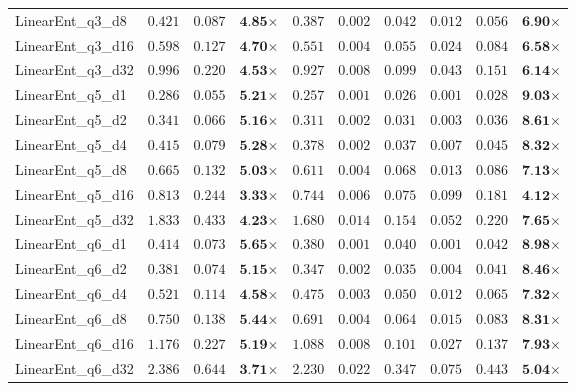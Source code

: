 \begin{table*}[t]
{\begin{tabular}{| l || r r c || r r r r r c |}
LinearEnt\_q3\_d8 & $0.421$ & $0.087$ & $\textbf{4.85}$$\times$ & $0.387$ & $0.002$ & $0.042$ & $0.012$ & $0.056$ & $\textbf{6.90}$$\times$ \\
LinearEnt\_q3\_d16 & $0.598$ & $0.127$ & $\textbf{4.70}$$\times$ & $0.551$ & $0.004$ & $0.055$ & $0.024$ & $0.084$ & $\textbf{6.58}$$\times$ \\
LinearEnt\_q3\_d32 & $0.996$ & $0.220$ & $\textbf{4.53}$$\times$ & $0.927$ & $0.008$ & $0.099$ & $0.043$ & $0.151$ & $\textbf{6.14}$$\times$ \\
LinearEnt\_q5\_d1 & $0.286$ & $0.055$ & $\textbf{5.21}$$\times$ & $0.257$ & $0.001$ & $0.026$ & $0.001$ & $0.028$ & $\textbf{9.03}$$\times$ \\
LinearEnt\_q5\_d2 & $0.341$ & $0.066$ & $\textbf{5.16}$$\times$ & $0.311$ & $0.002$ & $0.031$ & $0.003$ & $0.036$ & $\textbf{8.61}$$\times$ \\
LinearEnt\_q5\_d4 & $0.415$ & $0.079$ & $\textbf{5.28}$$\times$ & $0.378$ & $0.002$ & $0.037$ & $0.007$ & $0.045$ & $\textbf{8.32}$$\times$ \\
LinearEnt\_q5\_d8 & $0.665$ & $0.132$ & $\textbf{5.03}$$\times$ & $0.611$ & $0.004$ & $0.068$ & $0.013$ & $0.086$ & $\textbf{7.13}$$\times$ \\
LinearEnt\_q5\_d16 & $0.813$ & $0.244$ & $\textbf{3.33}$$\times$ & $0.744$ & $0.006$ & $0.075$ & $0.099$ & $0.181$ & $\textbf{4.12}$$\times$ \\
LinearEnt\_q5\_d32 & $1.833$ & $0.433$ & $\textbf{4.23}$$\times$ & $1.680$ & $0.014$ & $0.154$ & $0.052$ & $0.220$ & $\textbf{7.65}$$\times$ \\
LinearEnt\_q6\_d1 & $0.414$ & $0.073$ & $\textbf{5.65}$$\times$ & $0.380$ & $0.001$ & $0.040$ & $0.001$ & $0.042$ & $\textbf{8.98}$$\times$ \\
LinearEnt\_q6\_d2 & $0.381$ & $0.074$ & $\textbf{5.15}$$\times$ & $0.347$ & $0.002$ & $0.035$ & $0.004$ & $0.041$ & $\textbf{8.46}$$\times$ \\
LinearEnt\_q6\_d4 & $0.521$ & $0.114$ & $\textbf{4.58}$$\times$ & $0.475$ & $0.003$ & $0.050$ & $0.012$ & $0.065$ & $\textbf{7.32}$$\times$ \\
LinearEnt\_q6\_d8 & $0.750$ & $0.138$ & $\textbf{5.44}$$\times$ & $0.691$ & $0.004$ & $0.064$ & $0.015$ & $0.083$ & $\textbf{8.31}$$\times$ \\
LinearEnt\_q6\_d16 & $1.176$ & $0.227$ & $\textbf{5.19}$$\times$ & $1.088$ & $0.008$ & $0.101$ & $0.027$ & $0.137$ & $\textbf{7.93}$$\times$ \\
LinearEnt\_q6\_d32 & $2.386$ & $0.644$ & $\textbf{3.71}$$\times$ & $2.230$ & $0.022$ & $0.347$ & $0.075$ & $0.443$ & $\textbf{5.04}$$\times$ \\

\end{tabular}}
\end{table*}
